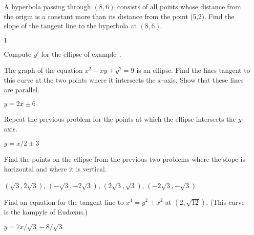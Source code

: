 \begin{exercises}
\begin{exercise}
A hyperbola passing through $(8,6)$ consists of all points whose distance
from the origin is a constant more than its distance from the point (5,2).
Find the slope of the tangent line to the hyperbola at $(8,6)$.
\begin{answer} $1$
\end{answer}\end{exercise}

\begin{exercise}
Compute $y'$ for the ellipse of example~.
\end{exercise}

\begin{exercise} The graph of the equation $x^2 - xy + y^2 = 9$ is an ellipse.
Find the lines tangent to this curve at the two
 points where it intersects the $x$-axis. Show that these lines are
 parallel.
\begin{answer} $y=2x\pm6$
\end{answer}\end{exercise}

\begin{exercise} Repeat the previous problem for the points at which the
 ellipse intersects the $y$-axis.
\begin{answer} $y=x/2\pm3$
\end{answer}\end{exercise}

\begin{exercise} Find the points on the ellipse from the previous two problems
 where the slope is horizontal and where it is vertical.
\begin{answer} $(\sqrt3,2\sqrt3)$, $(-\sqrt3,-2\sqrt3)$, $(2\sqrt3,\sqrt3)$,
$(-2\sqrt3,-\sqrt3)$ 
\end{answer}\end{exercise}

\begin{exercise} Find an equation for the tangent line to 
$x^4 = y^2 + x^2$ at $(2, \sqrt{12})$. 
(This curve is the {\dfont kampyle of Eudoxus}.)
\begin{answer} $y=7x/\sqrt3-8/\sqrt3$
\end{answer}\end{exercise}


\end{exercises}
